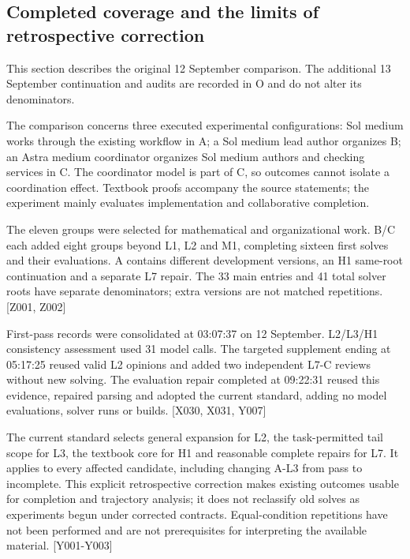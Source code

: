 \subsection[Completed coverage and the limits of retrospective correction]{\texorpdfstring{\protect\hypertarget{n3}{}Completed coverage and the limits of retrospective correction}{Completed coverage and the limits of retrospective correction}}
This section describes the original 12 September comparison. The additional 13 September continuation and audits are recorded in O and do not alter its denominators.

The comparison concerns three executed experimental configurations: Sol medium works through the existing workflow in A; a Sol medium lead author organizes B; an Astra medium coordinator organizes Sol medium authors and checking services in C. The coordinator model is part of C, so outcomes cannot isolate a coordination effect. Textbook proofs accompany the source statements; the experiment mainly evaluates implementation and collaborative completion.

The eleven groups were selected for mathematical and organizational work. B/C each added eight groups beyond L1, L2 and M1, completing sixteen first solves and their evaluations. A contains different development versions, an H1 same-root continuation and a separate L7 repair. The 33 main entries and 41 total solver roots have separate denominators; extra versions are not matched repetitions. [Z001, Z002]

First-pass records were consolidated at 03:07:37 on 12 September. L2/L3/H1 consistency assessment used 31 model calls. The targeted supplement ending at 05:17:25 reused valid L2 opinions and added two independent L7-C reviews without new solving. The evaluation repair completed at 09:22:31 reused this evidence, repaired parsing and adopted the current standard, adding no model evaluations, solver runs or builds. [X030, X031, Y007]

The current standard selects general expansion for L2, the task-permitted tail scope for L3, the textbook core for H1 and reasonable complete repairs for L7. It applies to every affected candidate, including changing A-L3 from pass to incomplete. This explicit retrospective correction makes existing outcomes usable for completion and trajectory analysis; it does not reclassify old solves as experiments begun under corrected contracts. Equal-condition repetitions have not been performed and are not prerequisites for interpreting the available material. [Y001-Y003]

